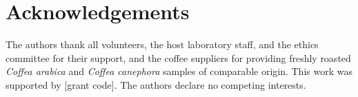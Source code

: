 \documentclass[conference]{IEEEtran}
\begin{document}
\section*{Acknowledgements}
The authors thank all volunteers, the host laboratory staff, and the ethics committee for their support, and the coffee suppliers for providing freshly roasted \textit{Coffea arabica} and \textit{Coffea canephora} samples of comparable origin. This work was supported by [grant code]. The authors declare no competing interests.



\end{document}
